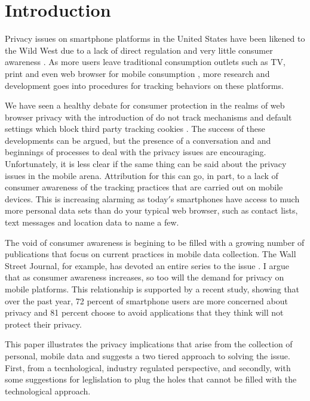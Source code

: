 \section {Introduction}

Privacy issues on smartphone platforms in the United States have been likened to the Wild West due to a lack of direct regulation \cite{Priv2013} and very little consumer awareness \cite{Jenn2012}. As more users leave traditional consumption outlets such as TV, print and even web browser for mobile consumption \cite{Abi2012}, more research and development goes into procedures for tracking behaviors on these platforms.

We have seen a healthy debate for consumer protection in the realms of web browser privacy with the introduction of do not track mechanisms \cite{W3C2012} and default settings which block third party tracking cookies \cite{Moz2013}. The success of these developments can be argued, 
but the presence of a conversation and and beginnings of processes to deal with the privacy issues are encouraging. 
Unfortunately, it is less clear if the same thing can be said about the privacy issues in the mobile arena. 
Attribution for this can go, in part, to a lack of consumer awareness of the tracking practices that are carried out on mobile devices\cite{Jenn2012}. 
This is increasing alarming as today$'$s smartphones have access to much more personal data sets than do your typical web browser, such as contact lists, text messages and location data to name a few. 


The void of consumer awareness is begining to be filled with a growing number of publications that focus on current practices in mobile data collection. The Wall Street Journal, for example, has devoted an entire series to the issue \cite{Wsj2013}. I argue that as consumer awareness increases, so too will the demand for privacy on mobile platforms. This relationship is supported by a recent study\cite{Trust2013}, showing that over the past year, 72 percent of smartphone users are more concerned about privacy and 81 percent choose to avoid applications that they think will not protect their privacy. 

This paper illustrates the privacy implications that arise from the collection of personal, mobile data and suggests a two tiered approach to solving the issue. First, from a tecnhological, industry regulated perspective, and secondly, with some suggestions for leglislation to plug the holes that cannot be filled with the technological approach. 
